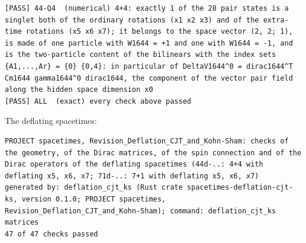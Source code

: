 \documentclass[
  10pt,
]{article}
\begin{document}
\begin{verbatim}
[PASS] 44-Q4  (numerical) 4+4: exactly 1 of the 28 pair states is a singlet both of the ordinary rotations (x1 x2 x3) and of the extra-time rotations (x5 x6 x7); it belongs to the space vector (2, 2; 1), is made of one particle with W1644 = +1 and one with W1644 = -1, and is the two-particle content of the bilinears with the index sets {A1,...,Ar} = {0} {0,4}: in particular of DeltaV1644^0 = dirac1644^T Cm1644 gamma1644^0 dirac1644, the component of the vector pair field along the hidden space dimension x0
[PASS] ALL  (exact) every check above passed
\end{verbatim}

The deflating spacetimes:

\begin{verbatim}
PROJECT spacetimes, Revision_Deflation_CJT_and_Kohn-Sham: checks of the geometry, of the Dirac matrices, of the spin connection and of the Dirac operators of the deflating spacetimes (44d-..: 4+4 with deflating x5, x6, x7; 71d-..: 7+1 with deflating x5, x6, x7)
generated by: deflation_cjt_ks (Rust crate spacetimes-deflation-cjt-ks, version 0.1.0; PROJECT spacetimes, Revision_Deflation_CJT_and_Kohn-Sham); command: deflation_cjt_ks matrices
47 of 47 checks passed


\end{verbatim}
\end{document}
